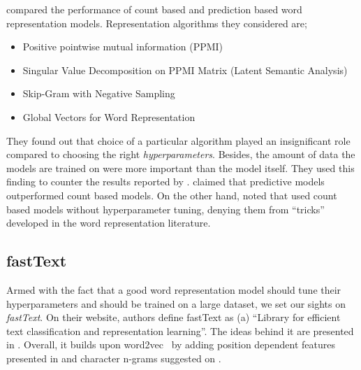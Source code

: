 
\textcite{levy_improving_2015} compared the performance of count based and prediction based word representation models.
Representation algorithms they considered are;
\begin{itemize}
    \item Positive pointwise mutual information (PPMI)~\cite{church_word_1990, bullinaria_extracting_2007}
    \item Singular Value Decomposition on PPMI Matrix (Latent Semantic Analysis)~\cite{deerwester_indexing_1990}
    \item Skip-Gram with Negative Sampling~\cite{mikolov_distributed_2013}
    \item Global Vectors for Word Representation~\cite{pennington_glove_2014}
\end{itemize}
They found out that choice of a particular algorithm played an insignificant role compared to choosing the right \emph{hyperparameters}.
Besides, the amount of data the models are trained on were more important than the model itself.
They used this finding to counter the results reported by \textcite{baroni_dont_2014}.
\citeauthor{baroni_dont_2014} claimed that predictive models outperformed count based models.
On the other hand, \citeauthor{levy_improving_2015} noted that \citeauthor{baroni_dont_2014} used count based models without hyperparameter tuning, denying them from \enquote{tricks} developed in the word representation literature.

\subsection{fastText}%
\label{sub:fasttext}

Armed with the fact that a good word representation model should tune their hyperparameters and should be trained on a large dataset, we set our sights on \emph{fastText}.
On their website, authors define fastText as (a) \enquote{Library for efficient text classification and representation learning}.
The ideas behind it are presented in \textcite{mikolov2018advances}.
Overall, it builds upon word2vec~\cite{mikolov_distributed_2013} by adding position dependent features presented in \textcite{mnih_learning_2013} and character n-grams suggested on \textcite{bojanowski_enriching_2016}.

